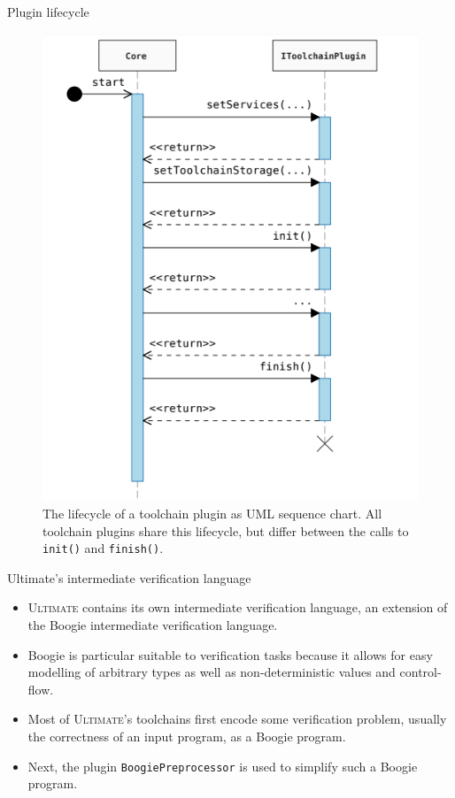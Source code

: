 \documentclass[12pt]{beamer}
\newcommand{\code}[1]{\texttt{#1}}
\newcommand{\ultimate}{\textsc{Ultimate }}
\newcommand{\ultimates}{\textsc{Ultimate}'s }
\begin{document}
\captionsetup[figure]{font=scriptsize ,labelfont=scriptsize}
\begin{frame}{Plugin lifecycle}
    \begin{figure}
        \centering
        \includegraphics[scale=0.425]{pluginLifecycle.png}
        \caption{The lifecycle of a toolchain plugin as UML sequence chart. All toolchain plugins share this lifecycle, but differ between the calls to \code{init()} and \code{finish()}.
		}
    \end{figure}    
\end{frame}

\begin{frame}{Ultimate's intermediate verification language}
	\begin{itemize}
		\item \ultimate contains its own intermediate verification language, an extension of the Boogie intermediate verification language.
		\item  Boogie is particular suitable to verification tasks because it allows for easy modelling of arbitrary types as well as non-deterministic values and control-flow. 
		\item Most of \ultimates toolchains first encode some verification problem, usually the correctness of an input program, as a Boogie program.
		\item Next, the plugin \code{BoogiePreprocessor} is used to simplify such a Boogie program.
	\end{itemize}
\end{frame}
\end{document}
